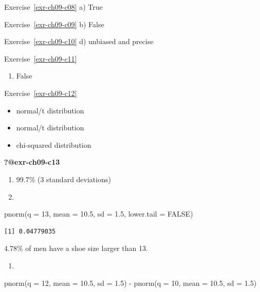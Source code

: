 \documentclass[
  letterpaper,
  DIV=11,
  numbers=noendperiod]{scrreprt}
\newenvironment{Shaded}{\begin{snugshade}}{\end{snugshade}}
\newcommand{\AttributeTok}[1]{\textcolor[rgb]{0.40,0.45,0.13}{#1}}
\newcommand{\ConstantTok}[1]{\textcolor[rgb]{0.56,0.35,0.01}{#1}}
\newcommand{\DecValTok}[1]{\textcolor[rgb]{0.68,0.00,0.00}{#1}}
\newcommand{\FloatTok}[1]{\textcolor[rgb]{0.68,0.00,0.00}{#1}}
\newcommand{\FunctionTok}[1]{\textcolor[rgb]{0.28,0.35,0.67}{#1}}
\newcommand{\NormalTok}[1]{\textcolor[rgb]{0.00,0.23,0.31}{#1}}
\newcommand{\SpecialCharTok}[1]{\textcolor[rgb]{0.37,0.37,0.37}{#1}}
\providecommand{\tightlist}{%
  \setlength{\itemsep}{0pt}\setlength{\parskip}{0pt}}\usepackage{longtable,booktabs,array}
\theoremstyle{definition}
\theoremstyle{remark}
\begin{document}
Exercise~\ref{exr-ch09-c08} a) True

Exercise~\ref{exr-ch09-c09} b) False

Exercise~\ref{exr-ch09-c10} d) unbiased and precise

Exercise~\ref{exr-ch09-c11}

\begin{enumerate}
\def\labelenumi{\alph{enumi})}
\setcounter{enumi}{1}
\tightlist
\item
  False
\end{enumerate}

Exercise~\ref{exr-ch09-c12}

\begin{itemize}
\tightlist
\item
  normal/t distribution
\item
  normal/t distribution
\item
  chi-squared distribution
\end{itemize}

\textbf{?@exr-ch09-c13}

\begin{enumerate}
\def\labelenumi{\alph{enumi})}
\item
  99.7\% (3 standard deviations)
\item
\end{enumerate}

\begin{Shaded}
\begin{Highlighting}[]
\FunctionTok{pnorm}\NormalTok{(}\AttributeTok{q =} \DecValTok{13}\NormalTok{, }\AttributeTok{mean =} \FloatTok{10.5}\NormalTok{, }\AttributeTok{sd =} \FloatTok{1.5}\NormalTok{, }
      \AttributeTok{lower.tail =} \ConstantTok{FALSE}\NormalTok{)}
\end{Highlighting}
\end{Shaded}

\begin{verbatim}
[1] 0.04779035
\end{verbatim}

4.78\% of men have a shoe size larger than 13.

\begin{enumerate}
\def\labelenumi{\alph{enumi})}
\setcounter{enumi}{2}
\tightlist
\item
\end{enumerate}

\begin{Shaded}
\begin{Highlighting}[]
\FunctionTok{pnorm}\NormalTok{(}\AttributeTok{q =} \DecValTok{12}\NormalTok{, }\AttributeTok{mean =} \FloatTok{10.5}\NormalTok{, }\AttributeTok{sd =} \FloatTok{1.5}\NormalTok{) }\SpecialCharTok{{-}} \FunctionTok{pnorm}\NormalTok{(}\AttributeTok{q =} \DecValTok{10}\NormalTok{, }\AttributeTok{mean =} \FloatTok{10.5}\NormalTok{, }\AttributeTok{sd =} \FloatTok{1.5}\NormalTok{)}
\end{Highlighting}
\end{Shaded}
\end{document}
